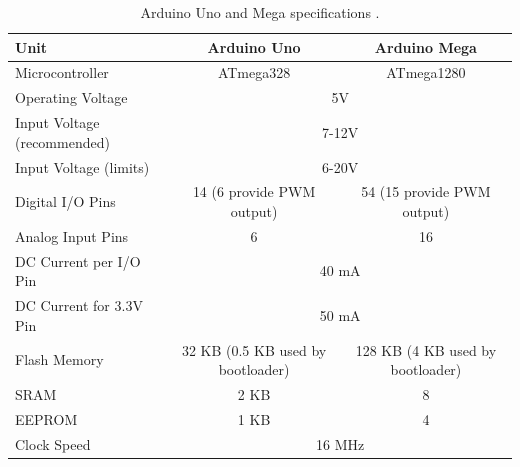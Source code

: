 \begin{center}

\begin{table}[]
	\centering
	\begin{tabular}{|l|c|c|}
		\hline
		\rowcolor[HTML]{C0C0C0} 
		Unit                        & Arduino Uno                       & Arduino Mega                     \\ \hline
		Microcontroller             & ATmega328                         & ATmega1280                       \\
		Operating Voltage           & \multicolumn{2}{c|}{5V}                                              \\
		Input Voltage (recommended) & \multicolumn{2}{c|}{7-12V}                                           \\
		Input Voltage (limits)      & \multicolumn{2}{c|}{6-20V}                                           \\
		Digital I/O Pins            & 14 (6 provide PWM output)         & 54 (15 provide PWM output)       \\
		Analog Input Pins           & 6                                 & 16                               \\
		DC Current per I/O Pin      & \multicolumn{2}{c|}{40 mA}                                           \\
		DC Current for 3.3V Pin     & \multicolumn{2}{c|}{50 mA}                                           \\
		Flash Memory                & 32 KB (0.5 KB used by bootloader) & 128 KB (4 KB used by bootloader) \\
		SRAM                        & 2 KB                              & 8                                \\
		EEPROM                      & 1 KB                              & 4                                \\
		Clock Speed                 & \multicolumn{2}{c|}{16 MHz}                                          \\ \hline
	\end{tabular}
	\caption{Arduino Uno and Mega specifications \cite{arduinouno}\cite{arduinomega}.}
\end{table}\label{tab:arduspecs}
\end{center}

